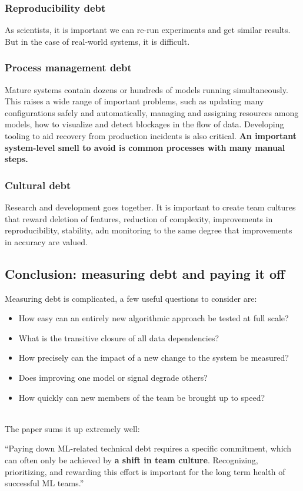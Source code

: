 \documentclass[../main.tex]{subfiles}
\begin{document}
\subsubsection{Reproducibility debt}
As scientists, it is important we can re-run experiments and get similar results. But in the case
of real-world systems, it is difficult.

\subsubsection{Process management debt}
Mature systems contain dozens or hundreds of models running simultaneously. This raises a wide range
of important problems, such as updating many configurations safely and automatically, managing and assigning
resources among models, how to visualize and detect blockages in the flow of data. Developing tooling
to aid recovery from production incidents is also critical. \textbf{An important system-level smell
to avoid is common processes with many manual steps.}

\subsubsection{Cultural debt}
Research and development goes together. It is important to create team cultures that reward deletion
of features, reduction of complexity, improvements in reproducibility, stability, adn monitoring to the
same degree that improvements in accuracy are valued.

\subsection{Conclusion: measuring debt and paying it off}
Measuring debt is complicated, a few useful questions to consider are:
\begin{itemize}
    \item How easy can an entirely new algorithmic approach be tested at full scale?
    \item What is the transitive closure of all data dependencies?
    \item How precisely can the impact of a new change to the system be measured?
    \item Does improving one model or signal degrade others?
    \item How quickly can new members of the team be brought up to speed?
\end{itemize}
\\
The paper sums it up extremely well:
\begin{displayquote}
    \enquote{Paying down ML-related technical debt requires a specific commitment, which can often only
        be achieved by \textbf{a shift in team culture}. Recognizing, prioritizing, and rewarding this
        effort is important for the long term health of successful ML teams.}
\end{displayquote}
\end{document}
